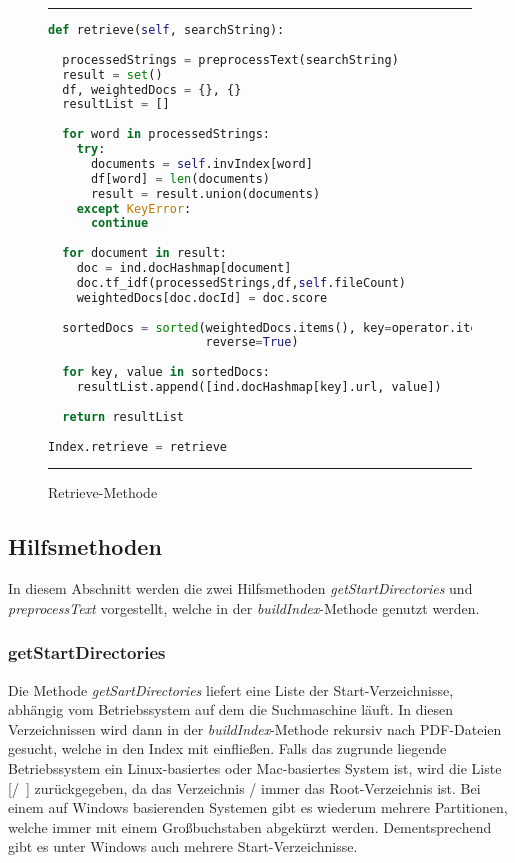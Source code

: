 \begin{figure}
	\rule{\textwidth}{0.4pt}
	\begin{lstlisting}[language=Python]
def retrieve(self, searchString):
	
  processedStrings = preprocessText(searchString)
  result = set()
  df, weightedDocs = {}, {}
  resultList = []
	
  for word in processedStrings:
    try:
      documents = self.invIndex[word]
      df[word] = len(documents)
      result = result.union(documents)
    except KeyError:
      continue
	
  for document in result:
    doc = ind.docHashmap[document]
    doc.tf_idf(processedStrings,df,self.fileCount)
    weightedDocs[doc.docId] = doc.score
	
  sortedDocs = sorted(weightedDocs.items(), key=operator.itemgetter(1),
                      reverse=True)
	
  for key, value in sortedDocs:
    resultList.append([ind.docHashmap[key].url, value])
	
  return resultList
	
Index.retrieve = retrieve
	\end{lstlisting}
	\rule{\textwidth}{0.4pt}
	\caption{Retrieve-Methode}
	\label{fig:retrieve}
\end{figure}


\subsection{Hilfsmethoden}\label{hilfsmethoden}

In diesem Abschnitt werden die zwei Hilfsmethoden \textit{getStartDirectories} und \textit{preprocessText} vorgestellt, welche in der \textit{buildIndex}-Methode genutzt werden.

\subsubsection{getStartDirectories}

Die Methode \textit{getSartDirectories} liefert eine Liste der Start-Verzeichnisse, abhängig vom Betriebssystem auf dem die Suchmaschine läuft. In diesen Verzeichnissen wird dann in der \textit{buildIndex}-Methode rekursiv nach PDF-Dateien gesucht, welche in den Index mit einfließen. Falls das zugrunde liegende Betriebssystem ein Linux-basiertes oder Mac-basiertes System ist, wird die Liste [\glqq /\grqq\ ] zurückgegeben, da das Verzeichnis / immer das Root-Verzeichnis ist. Bei einem auf Windows basierenden Systemen gibt es wiederum mehrere Partitionen, welche immer mit einem Großbuchstaben abgekürzt werden. Dementsprechend gibt es unter Windows auch mehrere Start-Verzeichnisse.

